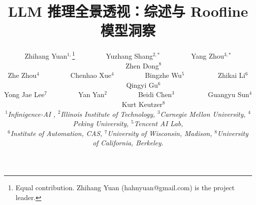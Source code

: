 \documentclass[10pt,twocolumn,letterpaper]{article}
\title{LLM 推理全景透视：综述与 Roofline 模型洞察}
\author{
  Zhihang Yuan$^{1,}$\thanks{Equal contribution. Zhihang Yuan (hahnyuan@gmail.com) is the project leader.}~~~~~~~~~Yuzhang Shang$^{2,*}$~~~~~~~~~Yang Zhou$^{3,*}$~~~~~~~~~Zhen Dong$^{8}$\\
  Zhe Zhou$^{4}$~~~~~~~~~Chenhao Xue$^{4}$~~~~~~~~~Bingzhe Wu$^{5}$~~~~~~~~~ Zhikai Li$^{6}$~~~~~~~~~Qingyi Gu$^{6}$\\
  Yong Jae Lee$^{7}$~~~~~~~~~Yan Yan$^{2}$~~~~~~~~~Beidi Chen$^{3}$~~~~~~~~~ Guangyu Sun$^{4}$~~~~~~~~~Kurt Keutzer$^{8}$ \vspace{8pt} \\
  \fontsize{11}{15}\selectfont \textit{$^{1}$Infinigence-AI , $^{2}$Illinois Institute of Technology, $^{3}$Carnegie Mellon University, $^{4}$Peking University, $^{5}$Tencent AI Lab,}\\
  \fontsize{11}{15}\selectfont \textit{$^{6}$Institute of Automation, CAS, $^{7}$University of Wisconsin, Madison, $^{8}$University of California, Berkeley.}
}
\begin{document}
\maketitle










\clearpage
{\small

}
\end{document}
